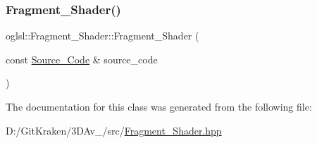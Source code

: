 \subsubsection{\texorpdfstring{Fragment\+\_\+\+Shader()}{Fragment\_Shader()}}
{\footnotesize\ttfamily oglsl\+::\+Fragment\+\_\+\+Shader\+::\+Fragment\+\_\+\+Shader (\begin{DoxyParamCaption}\item[{const \mbox{\hyperlink{classoglsl_1_1_shader_1_1_source___code}{Source\+\_\+\+Code}} \&}]{source\+\_\+code }\end{DoxyParamCaption})\hspace{0.3cm}{\ttfamily [inline]}}



The documentation for this class was generated from the following file\+:\begin{DoxyCompactItemize}
\item 
D\+:/\+Git\+Kraken/3\+D\+Av\+\_/src/\mbox{\hyperlink{_fragment___shader_8hpp}{Fragment\+\_\+\+Shader.\+hpp}}\end{DoxyCompactItemize}
